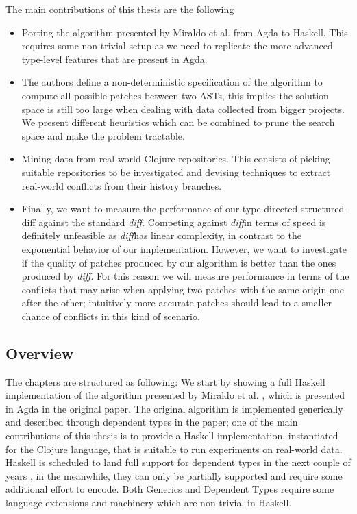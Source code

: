 \documentclass[11pt, titlepage]{article}
\newcommand{\diff}{\emph{diff}}
\begin{document}
The main contributions of this thesis are the following 
\begin{itemize}
\item Porting the algorithm presented by Miraldo et al. from Agda to Haskell. This requires some non-trivial setup as we need to replicate the more advanced type-level features that are present in Agda.
\item The authors define a non-deterministic specification of the algorithm to compute all possible patches between two ASTs, this implies the solution space is still too large when dealing with data collected from bigger projects. We present different heuristics which can be combined to prune the search space and make the problem tractable.
\item Mining data from real-world Clojure repositories. This consists of picking suitable repositories to be investigated and devising techniques to extract real-world conflicts from their history branches.
\item Finally, we want to measure the performance of our type-directed structured-diff against the standard \diff. Competing against \diff in terms of speed is definitely unfeasible as \diff has linear complexity, in contrast to the exponential behavior of our implementation. However, we want to investigate if the quality of patches produced by our algorithm is better than the ones produced by \diff. For this reason we will measure performance in terms of the conflicts that may arise when applying two patches with the same origin one after the other; intuitively more accurate patches should lead to a smaller chance of conflicts in this kind of scenario. 
\end{itemize}


\subsection{Overview}\label{overview}
The chapters are structured as following: 
We start by showing a full Haskell implementation of the algorithm presented by Miraldo et al. \cite{type-directed-diff}, which is presented in Agda in the original paper. 
The original algorithm is implemented generically and described through dependent types in the paper; one of the main contributions of this thesis is to provide a Haskell implementation, instantiated for the Clojure language, that is suitable to run experiments on real-world data. 
Haskell is scheduled to land full support for dependent types in the next couple of years \cite{dependent-haskell}, in the meanwhile, they can only be partially supported and require some additional effort to encode.
Both Generics and Dependent Types require some language extensions and machinery which are non-trivial in Haskell.
\end{document}
